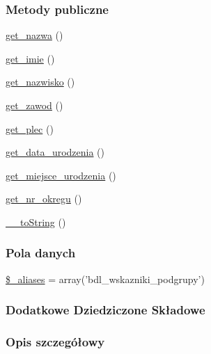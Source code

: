 \subsubsection*{Metody publiczne}
\begin{DoxyCompactItemize}
\item 
\hyperlink{classep___b_d_l___podgrupa_ac0818f0049d7b84f08f77128f54cee36}{get\-\_\-nazwa} ()
\item 
\hyperlink{classep___b_d_l___podgrupa_ac4b0c85dc2a130038f2d118dbd0c3d77}{get\-\_\-imie} ()
\item 
\hyperlink{classep___b_d_l___podgrupa_abdd1d7ff92508da7f748ba1feec97af0}{get\-\_\-nazwisko} ()
\item 
\hyperlink{classep___b_d_l___podgrupa_af80ca8310b60004454dd02a387deaa2c}{get\-\_\-zawod} ()
\item 
\hyperlink{classep___b_d_l___podgrupa_ac7f9af5c3fa024e4c26a7b6bd4ce4bb4}{get\-\_\-plec} ()
\item 
\hyperlink{classep___b_d_l___podgrupa_a880b240cd2d8c336fd1709bf0cb1ae2c}{get\-\_\-data\-\_\-urodzenia} ()
\item 
\hyperlink{classep___b_d_l___podgrupa_ac57c08ec5e394a19c5bd9280c8376182}{get\-\_\-miejsce\-\_\-urodzenia} ()
\item 
\hyperlink{classep___b_d_l___podgrupa_a2645a9f0aa5b0ccc482943348c033d0a}{get\-\_\-nr\-\_\-okregu} ()
\item 
\hyperlink{classep___b_d_l___podgrupa_a7516ca30af0db3cdbf9a7739b48ce91d}{\-\_\-\-\_\-to\-String} ()
\end{DoxyCompactItemize}
\subsubsection*{Pola danych}
\begin{DoxyCompactItemize}
\item 
\hyperlink{classep___b_d_l___podgrupa_ab4e31d75f0bc5d512456911e5d01366b}{\$\-\_\-aliases} = array('bdl\-\_\-wskazniki\-\_\-podgrupy')
\end{DoxyCompactItemize}
\subsubsection*{Dodatkowe Dziedziczone Składowe}


\subsubsection{Opis szczegółowy}


